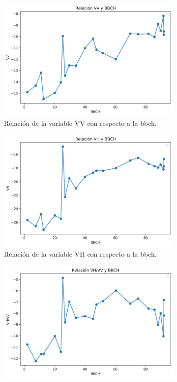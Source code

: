 \begin{figure}[H]
\centering
\begin{subfigure}{.45\textwidth}
  \centering
  \includegraphics[width=\linewidth]{archivos/VV}
  \caption{Relación de la variable VV con respecto a la \gls{bbch}. \label{fig:VV}}
\end{subfigure}%
\begin{subfigure}{.45\textwidth}
  \centering
  \includegraphics[width=\linewidth]{archivos/VH}
  \caption{Relación de la variable VH con respecto a la \gls{bbch}.\label{fig:VH}}
\end{subfigure}
\begin{subfigure}{.45\textwidth}
  \centering
  \includegraphics[width=\linewidth]{archivos/RATIO}

\end{subfigure}
\end{figure}
